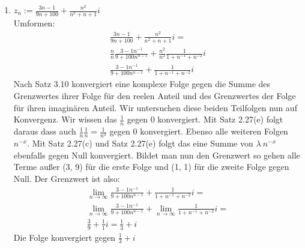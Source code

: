 \documentclass{article}
\begin{document}
\begin{enumerate}[ label = (\alph*) ]
\begin{enumerate}[ label = (\roman*) ]
            \item \(z_n := \frac{3n - 1}{9n + 100} + \frac{n^2}{n^2 + n + 1}i \) \\
            Umformen:
            \begin{gather*}
                \frac{3n - 1}{9n + 100} + \frac{n^2}{n^2 + n + 1}i = \\
                \frac{n}{n} \frac{3 - 1n^{-1}}{9 + 100n^{n-1}} + \frac{n^2}{n^2} \frac{1}{1 + n^{-1} + n^{-2}}i \\
                \frac{3 - 1n^{-1}}{9 + 100n^{n-1}} + \frac{1}{1 + n^{-1} + n^{-2}}i
            \end{gather*}
            Nach Satz 3.10 konvergiert eine komplexe Folge gegen die Summe des Grenzwertes ihrer Folge für den reelen Anteil
            und des Grenzwertes der Folge für ihren imaginären Anteil. Wir untersuchen diese beiden Teilfolgen nun auf Konvergenz.
            Wir wissen das \(\frac{1}{n}\) gegen 0 konvergiert. Mit Satz 2.27(e) folgt daraus dass auch \(\frac{1}{n} \frac{1}{n} = \frac{1}{n^2}\) gegen 0 konvergiert.
            Ebenso alle weiteren Folgen \(n^{-x}\). Mit Satz 2.27(c) und Satz 2.27(e) folgt das eine Summe von \(\lambda \: n^{-x}\) ebenfalls gegen Null konvergiert.
            Bildet man nun den Grenzwert so gehen alle Terme außer (3, 9) für die erste Folge und (1, 1) für die zweite Folge gegen Null. Der Grenzwert ist also:
            \begin{gather*}
                \lim_{n \to \infty} \frac{3 - 1n^{-1}}{9 + 100n^{n-1}} + \frac{1}{1 + n^{-1} + n^{-2}}i = \\
                \lim_{n \to \infty} \frac{3 - 1n^{-1}}{9 + 100n^{n-1}} + \lim_{n \to \infty} \frac{1}{1 + n^{-1} + n^{-2}}i = \\
                \frac{3}{9} + \frac{1}{1}i = \frac{1}{3} + i
            \end{gather*}
            Die Folge konvergiert gegen \(\frac{1}{3} + i\)
        \end{enumerate}
    \end{enumerate}
\end{document}
